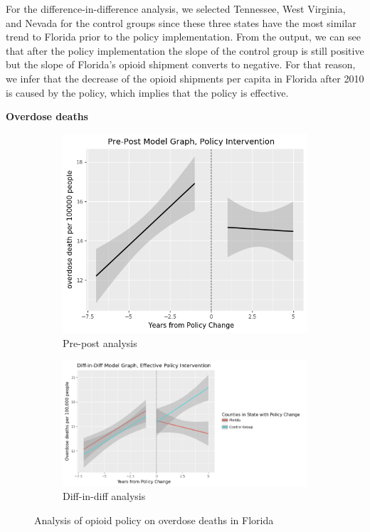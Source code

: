 \documentclass[12pt,letterpaper]{article}
\begin{document}
For the difference-in-difference analysis, we selected Tennessee, West Virginia, and Nevada for the control groups since these three states have the most similar trend to Florida prior to the policy implementation. From the output, we can see that after the policy implementation the slope of the control group is still positive but the slope of Florida's opioid shipment converts to negative. For that reason, we infer that the decrease of the opioid shipments per capita in Florida after 2010 is caused by the policy, which implies that the policy is effective. \\

\newpage

\noindent \textbf{Overdose deaths} \\

\begin{figure}[!h]
\centering
\begin{subfigure}{.5\textwidth}
  \centering
  \includegraphics[width=0.7\linewidth]{../30_results/General_Results/florida_overdose_death_prepost.png}
  \caption{Pre-post analysis}
  \label{fig:fl_death_prepost}
\end{subfigure}%
\begin{subfigure}{.55\textwidth}
  \centering
  \includegraphics[width=1\linewidth]{../30_results/General_Results/florida_overdose_death_diffdiff.png}
  \caption{Diff-in-diff analysis}
  \label{fig:fl_death_did}
\end{subfigure}
\caption{Analysis of opioid policy on overdose deaths in Florida}
\label{fig:fl_death}
\end{figure}
\end{document}
